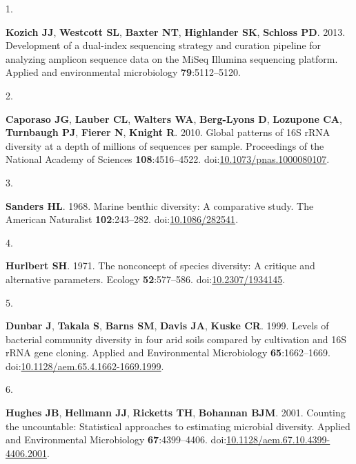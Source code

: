 \documentclass[
]{article}
\newlength{\cslhangindent}
\newlength{\csllabelwidth}
\newlength{\cslentryspacingunit} %
\newenvironment{CSLReferences}[2] %
 {%
  \setlength{\parindent}{0pt}
  \ifodd #1
  \let\oldpar\par
  \def\par{\hangindent=\cslhangindent\oldpar}
  \fi
  \setlength{\parskip}{#2\cslentryspacingunit}
 }%
 {}
\newcommand{\CSLLeftMargin}[1]{\parbox[t]{\csllabelwidth}{#1}}
\newcommand{\CSLRightInline}[1]{\parbox[t]{\linewidth - \csllabelwidth}{#1}\break}
\begin{document}
\hypertarget{refs}{}
\begin{CSLReferences}{0}{1}
\leavevmode{}%
\CSLLeftMargin{1. }%
\CSLRightInline{\textbf{Kozich JJ}, \textbf{Westcott SL}, \textbf{Baxter
NT}, \textbf{Highlander SK}, \textbf{Schloss PD}. 2013. {Development of
a dual-index sequencing strategy and curation pipeline for analyzing
amplicon sequence data on the MiSeq Illumina sequencing platform}.
Applied and environmental microbiology \textbf{79}:5112--5120.}

\leavevmode{}%
\CSLLeftMargin{2. }%
\CSLRightInline{\textbf{Caporaso JG}, \textbf{Lauber CL},
\textbf{Walters WA}, \textbf{Berg-Lyons D}, \textbf{Lozupone CA},
\textbf{Turnbaugh PJ}, \textbf{Fierer N}, \textbf{Knight R}. 2010.
Global patterns of 16S {rRNA} diversity at a depth of millions of
sequences per sample. Proceedings of the National Academy of Sciences
\textbf{108}:4516--4522.
doi:\href{https://doi.org/10.1073/pnas.1000080107}{10.1073/pnas.1000080107}.}

\leavevmode{}%
\CSLLeftMargin{3. }%
\CSLRightInline{\textbf{Sanders HL}. 1968. Marine benthic diversity: A
comparative study. The American Naturalist \textbf{102}:243--282.
doi:\href{https://doi.org/10.1086/282541}{10.1086/282541}.}

\leavevmode{}%
\CSLLeftMargin{4. }%
\CSLRightInline{\textbf{Hurlbert SH}. 1971. The nonconcept of species
diversity: A critique and alternative parameters. Ecology
\textbf{52}:577--586.
doi:\href{https://doi.org/10.2307/1934145}{10.2307/1934145}.}

\leavevmode{}%
\CSLLeftMargin{5. }%
\CSLRightInline{\textbf{Dunbar J}, \textbf{Takala S}, \textbf{Barns SM},
\textbf{Davis JA}, \textbf{Kuske CR}. 1999. Levels of bacterial
community diversity in four arid soils compared by cultivation and 16S
{rRNA} gene cloning. Applied and Environmental Microbiology
\textbf{65}:1662--1669.
doi:\href{https://doi.org/10.1128/aem.65.4.1662-1669.1999}{10.1128/aem.65.4.1662-1669.1999}.}

\leavevmode{}%
\CSLLeftMargin{6. }%
\CSLRightInline{\textbf{Hughes JB}, \textbf{Hellmann JJ},
\textbf{Ricketts TH}, \textbf{Bohannan BJM}. 2001. Counting the
uncountable: Statistical approaches to estimating microbial diversity.
Applied and Environmental Microbiology \textbf{67}:4399--4406.
doi:\href{https://doi.org/10.1128/aem.67.10.4399-4406.2001}{10.1128/aem.67.10.4399-4406.2001}.}


\end{CSLReferences}
\end{document}
